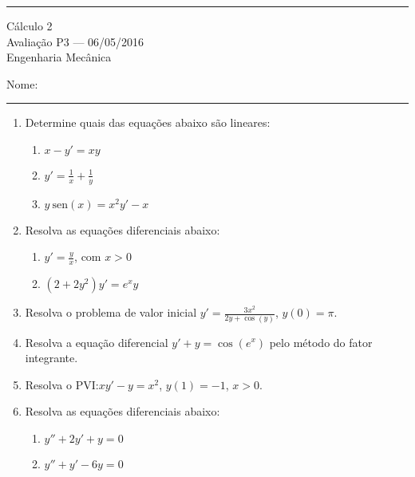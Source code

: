 \documentclass{article}
\newcommand{\ds}{\displaystyle}
\newcommand{\sen}{\mbox{sen}}
\begin{document}
\noindent{}\rule{\textwidth}{0.4pt}
\begin{center}
	C\'alculo 2\\
	Avalia\c{c}\~ao P3 --- 06/05/2016 \\
	Engenharia Mec\^anica \\
	\vspace{0.2cm}
\end{center}
Nome: \\
\noindent{}\rule{\textwidth}{0.4pt}

\begin{enumerate}
\item Determine quais das equa\c{c}\~oes abaixo s\~ao lineares:
	\begin{enumerate}
		\item $\ds x-y' = xy$
		\item $\ds y' = \frac{1}{x} + \frac{1}{y}$
		\item $\ds y\ \sen(x) = x^2y' - x$
	\end{enumerate}

\item Resolva as equa\c{c}\~oes diferenciais abaixo:
	\begin{enumerate}
		\item $\ds y' = \frac{y}{x}$, com $x>0$
		\item $\ds (2+2y^2)y' = e^x y$
	\end{enumerate}

\item Resolva o problema de valor inicial $\ds y' = \frac{3x^2}{2y+\cos(y)}$, $y(0) = \pi$.

\item Resolva a equa\c{c}\~ao diferencial $y'+y=\cos(e^x)$ pelo m\'etodo do fator integrante.

\item Resolva o PVI:\@ $xy'-y=x^2$, $y(1)=-1$, $x>0$.

\item Resolva as equa\c{c}\~oes diferenciais abaixo:
	\begin{enumerate}
		\item $y''+2y'+y = 0$
		\item $y''+y'-6y=0$
	\end{enumerate}

\end{enumerate}
\end{document}

